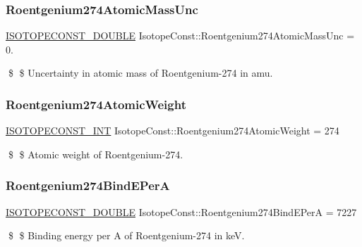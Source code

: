 \subsubsection{\texorpdfstring{Roentgenium274\+Atomic\+Mass\+Unc}{Roentgenium274AtomicMassUnc}}
{\footnotesize\ttfamily \mbox{\hyperlink{group___isotope_const-_macros_ga8f45a7272ce02c0b4c65c44636ed719a}{I\+S\+O\+T\+O\+P\+E\+C\+O\+N\+S\+T\+\_\+\+D\+O\+U\+B\+LE}} Isotope\+Const\+::\+Roentgenium274\+Atomic\+Mass\+Unc = 0.}

\$ \$ Uncertainty in atomic mass of Roentgenium-\/274 in amu. \mbox{\label{group___isotope_const-_roentgenium-_rg274_ga5286b838b2f03be74c935ca421b0d836}} 
\subsubsection{\texorpdfstring{Roentgenium274\+Atomic\+Weight}{Roentgenium274AtomicWeight}}
{\footnotesize\ttfamily \mbox{\hyperlink{group___isotope_const-_macros_ga5f18360b3e99483a35c32d789e62621c}{I\+S\+O\+T\+O\+P\+E\+C\+O\+N\+S\+T\+\_\+\+I\+NT}} Isotope\+Const\+::\+Roentgenium274\+Atomic\+Weight = 274}

\$ \$ Atomic weight of Roentgenium-\/274. \mbox{\label{group___isotope_const-_roentgenium-_rg274_ga135540ff0a6a41e43d6a17d1f995a085}} 
\subsubsection{\texorpdfstring{Roentgenium274\+Bind\+E\+PerA}{Roentgenium274BindEPerA}}
{\footnotesize\ttfamily \mbox{\hyperlink{group___isotope_const-_macros_ga8f45a7272ce02c0b4c65c44636ed719a}{I\+S\+O\+T\+O\+P\+E\+C\+O\+N\+S\+T\+\_\+\+D\+O\+U\+B\+LE}} Isotope\+Const\+::\+Roentgenium274\+Bind\+E\+PerA = 7227}

\$ \$ Binding energy per A of Roentgenium-\/274 in keV. \mbox{\label{group___isotope_const-_roentgenium-_rg274_gad23f713fd349c5394e547ced151ece70}} 
